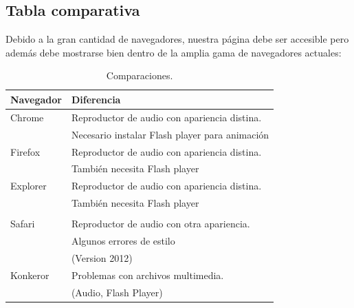 \subsection{Tabla comparativa}
Debido a la gran cantidad de navegadores, nuestra página debe ser accesible pero además debe mostrarse bien dentro de la amplia gama de navegadores actuales:\\
\begin{table}[htbp]
	\begin{center}
		\begin{tabular}{|l|l|}
			\hline
			Navegador & Diferencia \\
			\hline \hline
			Chrome & Reproductor de audio con apariencia distina. \\ & Necesario instalar Flash player para animación \\ \hline
			Firefox & Reproductor de audio con apariencia distina. \\ & También necesita Flash player \\ \hline
			Explorer & Reproductor de audio con apariencia distina. \\ & También necesita Flash player \\ \\ \hline
			Safari & Reproductor de audio con otra apariencia.  \\ & Algunos errores de estilo \\ &(Version 2012) \\ \hline
			Konkeror & Problemas con archivos multimedia. \\
			& (Audio, Flash Player) \\ \hline
		\end{tabular}
		\caption{Comparaciones.}
		\label{tabla:sencilla}
	\end{center}
\end{table}\\


